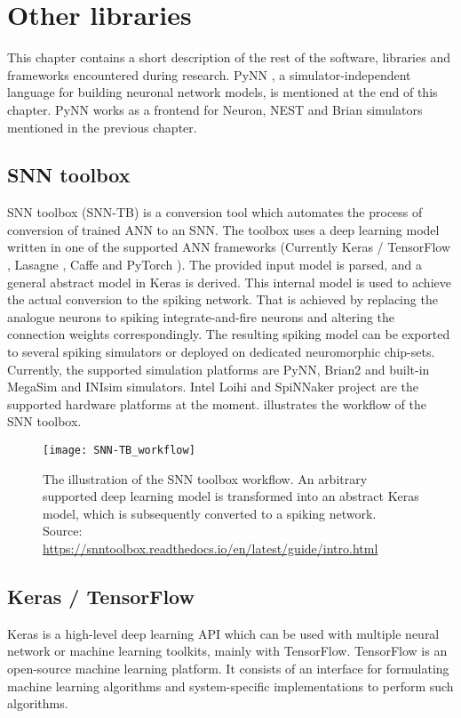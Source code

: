 \chapter{Other libraries} \label{chap:04}

This chapter contains a short description of the rest of the software, libraries and frameworks encountered during research. PyNN \cite{davisonPyNNCommonInterface2009}, a simulator-independent language for building neuronal network models, is mentioned at the end of this chapter. PyNN works as a frontend for Neuron, NEST and Brian simulators mentioned in the previous chapter.

\section{SNN toolbox}
SNN toolbox (SNN-TB) \cite{rueckauerConversionContinuousValuedDeep2017} is a conversion tool which automates the process of conversion of trained ANN to an SNN. The toolbox uses a deep learning model written in one of the supported ANN frameworks (Currently Keras / TensorFlow \cite{cholletKeras15}, Lasagne \cite{sanderdielemanLasagneFirst15}, Caffe \cite{jiaCaffeConvolutional14} and PyTorch \cite{paszkePyTorchImperative19}). The provided input model is parsed, and a general abstract model in Keras is derived. This internal model is used to achieve the actual conversion to the spiking network. That is achieved by replacing the analogue neurons to spiking integrate-and-fire neurons and altering the connection weights correspondingly. The resulting spiking model can be exported to several spiking simulators or deployed on dedicated neuromorphic chip-sets. Currently, the supported simulation platforms are PyNN, Brian2 and built-in MegaSim and INIsim simulators. Intel Loihi and SpiNNaker project are the supported hardware platforms at the moment.  illustrates the workflow of the SNN toolbox.

\begin{figure}[htbp]
    \centering
    \texttt{[image: SNN-TB\_workflow]}
    \caption{The illustration of the SNN toolbox workflow. An arbitrary supported deep learning model is transformed into an abstract Keras model, which is subsequently converted to a spiking network. Source: \url{https://snntoolbox.readthedocs.io/en/latest/guide/intro.html}}
    \label{fig:snn-tb_workflow}
\end{figure}

\section{Keras / TensorFlow}
Keras is a high-level deep learning API which can be used with multiple neural network or machine learning toolkits, mainly with TensorFlow. TensorFlow is an open-source machine learning platform. It consists of an interface for formulating machine learning algorithms and system-specific implementations to perform such algorithms.

